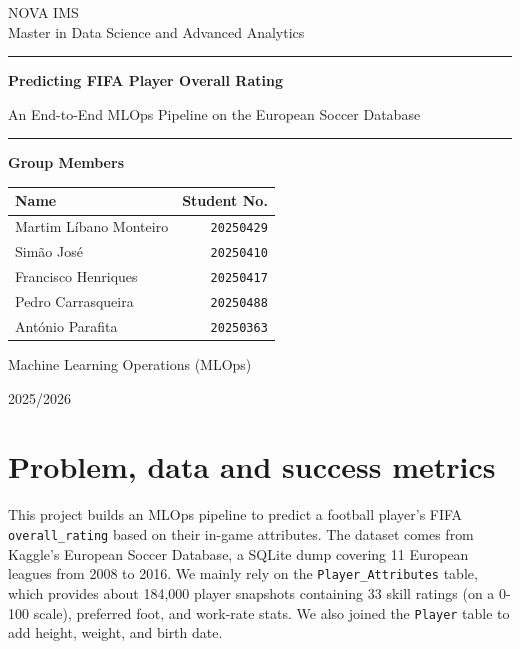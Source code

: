\documentclass[11pt,a4paper]{article}
\newcommand{\code}[1]{\texttt{\small #1}}
\newcommand{\studentrow}[2]{#1 & \texttt{#2}\\}
\begin{document}
\begin{titlepage}
\centering
\vspace*{0.6cm}

{\Large NOVA IMS\\[0.15cm]
Master in Data Science and Advanced Analytics\par}

\vspace{1.2cm}
{\rule{0.82\textwidth}{0.5pt}\par}
\vspace{0.9cm}

{\Huge\bfseries Predicting FIFA Player Overall Rating\par}
\vspace{0.35cm}
{\Large An End-to-End MLOps Pipeline on the European Soccer Database\par}

\vspace{0.9cm}
{\rule{0.82\textwidth}{0.5pt}\par}

\vfill

\begin{minipage}{0.72\textwidth}
\centering
{\large\bfseries Group Members\par}
\vspace{0.35cm}
\renewcommand{\arraystretch}{1.18}
\begin{tabular}{@{}>{\raggedright\arraybackslash}p{}r@{}}
\toprule
\textbf{Name} & \textbf{Student No.} \\
\midrule
\studentrow{Martim L\'ibano Monteiro}{20250429}
\studentrow{Sim\~ao Jos\'e}{20250410}
\studentrow{Francisco Henriques}{20250417}
\studentrow{Pedro Carrasqueira}{20250488}
\studentrow{Ant\'onio Parafita}{20250363}
\bottomrule
\end{tabular}
\end{minipage}

\vfill

{\large Machine Learning Operations (MLOps)\par}
\vspace{0.15cm}
{\large 2025/2026\par}

\end{titlepage}


\section{Problem, data and success metrics}
This project builds an MLOps pipeline to predict a football player's FIFA \code{overall\_rating} based on their in-game attributes. The dataset comes from Kaggle's European Soccer Database, a SQLite dump covering 11 European leagues from 2008 to 2016. We mainly rely on the \code{Player\_Attributes} table, which provides about 184,000 player snapshots containing 33 skill ratings (on a 0-100 scale), preferred foot, and work-rate stats. We also joined the \code{Player} table to add height, weight, and birth date.
\end{document}
